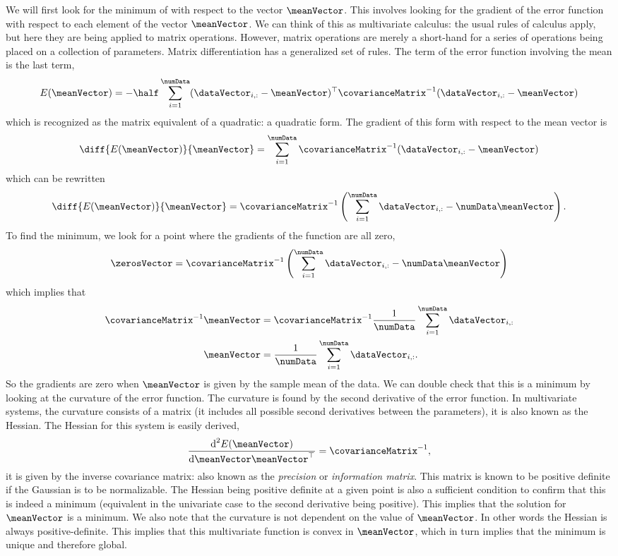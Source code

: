 We will first look for the minimum of  with
respect to the vector $\meanVector$. This involves looking for the
gradient of the error function with respect to each element of the
vector $\meanVector$. We can think of this as multivariate calculus:
the usual rules of calculus apply, but here they are being applied to
matrix operations. However, matrix operations are merely a short-hand
for a series of operations being placed on a collection of
parameters. Matrix differentiation has a
generalized set of rules. The term of the error function involving the
mean is the last term,
\[
E(\meanVector) = -\half\sum_{i=1}^\numData
(\dataVector_{i, :}-\meanVector)^\top
\covarianceMatrix^{-1}(\dataVector_{i, :}-\meanVector)
\]
which is recognized as the matrix equivalent of a quadratic: a
quadratic form. The gradient of this form with
respect to the mean vector is
\[
\diff{E(\meanVector)}{\meanVector} = \sum_{i=1}^\numData
\covarianceMatrix^{-1}(\dataVector_{i, :}-\meanVector)
\]
which can be rewritten
\[
\diff{E(\meanVector)}{\meanVector} =
\covarianceMatrix^{-1}\left(\sum_{i=1}^\numData\dataVector_{i,
    :}-\numData\meanVector\right).
\]
To find the minimum, we look for a point where the gradients of the
function are all zero,
\[
\zerosVector =
\covarianceMatrix^{-1}\left(\sum_{i=1}^\numData\dataVector_{i,
    :}-\numData\meanVector\right)
\]
which implies that
\begin{align*}
  \covarianceMatrix^{-1}\meanVector & = \covarianceMatrix^{-1}\frac{1}{\numData} \sum_{i=1}^\numData \dataVector_{i,:}\\
  \meanVector & = \frac{1}{\numData}
  \sum_{i=1}^\numData \dataVector_{i,:}.
\end{align*}
So the gradients are zero when $\meanVector$ is given by the sample
mean of the data. We can double check that this is a minimum by
looking at the curvature of the error function. The curvature is found
by the second derivative of the error function. In multivariate
systems, the curvature consists of a matrix (it includes all possible
second derivatives between the parameters), it is also known as the
Hessian. The Hessian for this system is easily derived,
\[
\frac{\text{d}^2E(\meanVector)}{\text{d}\meanVector\meanVector^\top}
= \covarianceMatrix^{-1},
\]
it is given by the inverse covariance matrix: also known as the
\emph{precision} or \emph{information
  matrix}. This matrix is known to be positive
definite if the Gaussian is to be normalizable. The Hessian being
positive definite at a given point is also a sufficient condition to
confirm that this is indeed a minimum (equivalent in the univariate
case to the second derivative being positive). This implies that the
solution for $\meanVector$ is a minimum. We also note that the
curvature is not dependent on the value of $\meanVector$. In other
words the Hessian is always positive-definite. This implies that this
multivariate function is convex in $\meanVector$, which in turn
implies that the minimum is unique and therefore global.

